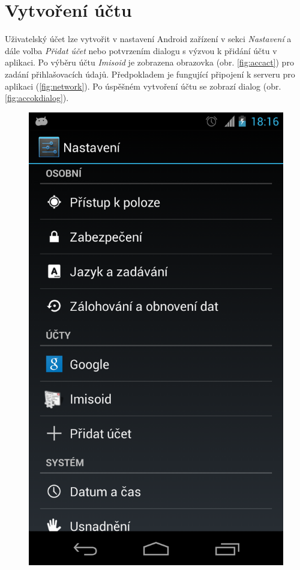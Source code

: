 \documentclass{diplomka}
\begin{document}
\section{Vytvoření účtu}
Uživatelský účet lze vytvořit v nastavení Android zařízení v sekci \emph{Nastavení} a dále volba \emph{Přidat účet} nebo potvrzením dialogu s výzvou k přidání účtu v aplikaci. Po výběru účtu  \emph{Imisoid} je zobrazena obrazovka (obr. \ref{fig:accact}) pro zadání přihlašovacích údajů. Předpokladem je fungující připojení k serveru pro aplikaci (\ref{fig:network}). Po úspěšném vytvoření účtu se zobrazí dialog (obr. \ref{fig:accokdialog}).
\begin{figure}[H]
\centering
\begin{minipage}{.45\textwidth}
  \centering
  \includegraphics[width=.75\linewidth]{scr/setting.png}
  \label{fig:setting}
\end{minipage}\hfill%
\begin{minipage}{.45\textwidth}

\end{minipage}
\end{figure}
\end{document}
